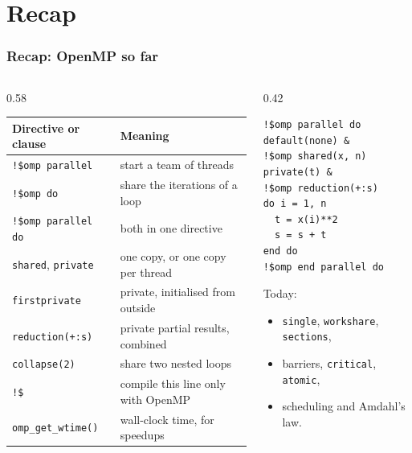 
\subtitle{Lecture 10: More OpenMP: Worksharing, Synchronisation, and Performance}



\begin{frame}
  \titlepage
\end{frame}


\section{Recap}

\begin{frame}[fragile]
  \frametitle{Recap: OpenMP so far}
  \begin{columns}[T]
    \begin{column}{0.58\textwidth}
      \centering
      \footnotesize
      \begin{tabular}{ll}
        \textbf{Directive or clause} & \textbf{Meaning} \\
        \hline
        \texttt{!\$omp parallel}       & start a team of threads \\
        \texttt{!\$omp do}             & share the iterations of a loop \\
        \texttt{!\$omp parallel do}    & both in one directive \\
        \texttt{shared}, \texttt{private} & one copy, or one copy per thread \\
        \texttt{firstprivate}          & private, initialised from outside \\
        \texttt{reduction(+:s)}        & private partial results, combined \\
        \texttt{collapse(2)}           & share two nested loops \\
        \texttt{!\$ }                  & compile this line only with OpenMP \\
        \texttt{omp\_get\_wtime()}     & wall-clock time, for speedups \\
        \hline
      \end{tabular}
    \end{column}

    \begin{column}{0.42\textwidth}
      \begin{lstlisting}
!$omp parallel do default(none) &
!$omp shared(x, n) private(t) &
!$omp reduction(+:s)
do i = 1, n
  t = x(i)**2
  s = s + t
end do
!$omp end parallel do
      \end{lstlisting}

      \vspace*{2mm}
      Today:
      \begin{itemize}
        \item \texttt{single}, \texttt{workshare}, \texttt{sections},
        \item barriers, \texttt{critical}, \texttt{atomic},
        \item scheduling and Amdahl's law.
      \end{itemize}
    \end{column}
  \end{columns}
\end{frame}


